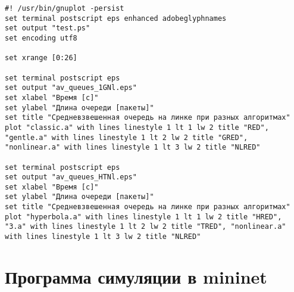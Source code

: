 \begin{verbatim}
#! /usr/bin/gnuplot -persist
set terminal postscript eps enhanced adobeglyphnames
set output "test.ps"
set encoding utf8

set xrange [0:26]

set terminal postscript eps
set output "av_queues_1GNl.eps"
set xlabel "Время [c]"
set ylabel "Длина очереди [пакеты]"
set title "Средневзвешенная очередь на линке при разных алгоритмах"
plot "classic.a" with lines linestyle 1 lt 1 lw 2 title "RED", "gentle.a" with lines linestyle 1 lt 2 lw 2 title "GRED", "nonlinear.a" with lines linestyle 1 lt 3 lw 2 title "NLRED" 

set terminal postscript eps
set output "av_queues_HTNl.eps"
set xlabel "Время [c]"
set ylabel "Длина очереди [пакеты]"
set title "Средневзвешенная очередь на линке при разных алгоритмах"
plot "hyperbola.a" with lines linestyle 1 lt 1 lw 2 title "HRED", "3.a" with lines linestyle 1 lt 2 lw 2 title "TRED", "nonlinear.a" with lines linestyle 1 lt 3 lw 2 title "NLRED" 
\end{verbatim}







\section*{Программа симуляции в mininet}

